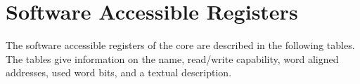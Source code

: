 \section{Software Accessible Registers}
\label{sec:re}

The software accessible registers of the core are described in the following
tables. The tables give information on the name, read/write capability, word 
aligned addresses, used word bits, and a textual description.


